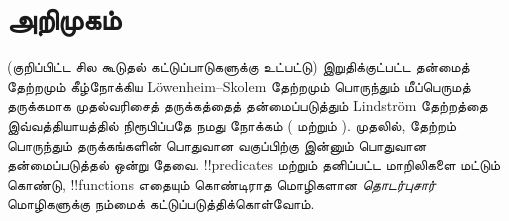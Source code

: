 \documentclass[../../../include/open-logic-section]{subfiles}
\begin{document}

\section{அறிமுகம்}

(குறிப்பிட்ட சில கூடுதல் கட்டுப்பாடுகளுக்கு உட்பட்டு) இறுதிக்குட்பட்ட
தன்மைத் தேற்றமும் கீழ்நோக்கிய L\"owenheim--Skolem தேற்றமும் பொருந்தும்
மீப்பெருமத் தருக்கமாக முதல்வரிசைத் தருக்கத்தைத் தன்மைப்படுத்தும்
Lindstr\"om தேற்றத்தை இவ்வத்தியாயத்தில் நிரூபிப்பதே நமது நோக்கம்
( மற்றும்
). முதலில், தேற்றம் பொருந்தும்
தருக்கங்களின் பொதுவான வகுப்பிற்கு இன்னும் பொதுவான தன்மைப்படுத்தல்
ஒன்று தேவை. !!{predicate}s மற்றும் தனிப்பட்ட மாறிலிகளை மட்டும்
கொண்டு, !!{function}s எதையும் கொண்டிராத மொழிகளான
\emph{தொடர்புசார்} மொழிகளுக்கு நம்மைக் கட்டுப்படுத்திக்கொள்வோம்.
\end{document}
